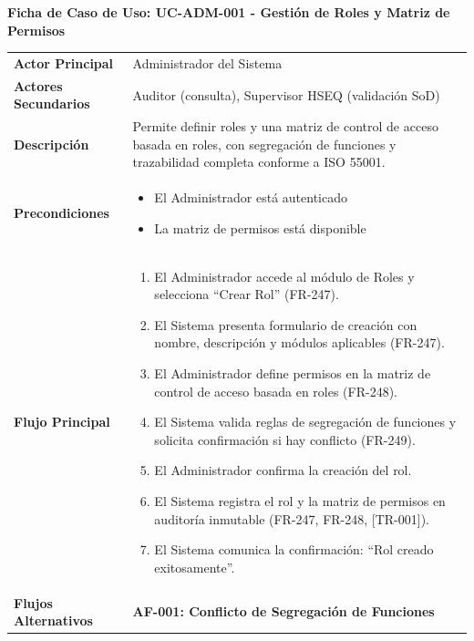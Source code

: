 \noindent\textbf{Ficha de Caso de Uso: UC-ADM-001 - Gestión de Roles y Matriz de Permisos}
\footnotesize\setlength{\tabcolsep}{4pt}\renewcommand{\arraystretch}{1.2}
\begin{longtable}{>{\raggedright\arraybackslash}p{0.21\textwidth} >{\raggedright\arraybackslash}p{0.74\textwidth}} \toprule
\textbf{Actor Principal} & Administrador del Sistema \\
\textbf{Actores Secundarios} & Auditor (consulta), Supervisor HSEQ (validación SoD) \\
\textbf{Descripción} & Permite definir roles y una matriz de control de acceso basada en roles, con segregación de funciones y trazabilidad completa conforme a ISO 55001. \\
\textbf{Precondiciones} & \parbox[t]{\linewidth}{\vspace{2pt} \begin{itemize}[leftmargin=1.5em, nosep, topsep=0pt]
\item El Administrador está autenticado
\item La matriz de permisos está disponible
\end{itemize} \vspace{2pt}} \\
\textbf{Flujo Principal} & \parbox[t]{\linewidth}{\vspace{2pt} \begin{enumerate}[leftmargin=1.5em, nosep, topsep=0pt]
\item El Administrador accede al módulo de Roles y selecciona ``Crear Rol'' (FR-247).
\item El Sistema presenta formulario de creación con nombre, descripción y módulos aplicables (FR-247).
\item El Administrador define permisos en la matriz de control de acceso basada en roles (FR-248).
\item El Sistema valida reglas de segregación de funciones y solicita confirmación si hay conflicto (FR-249).
\item El Administrador confirma la creación del rol.
\item El Sistema registra el rol y la matriz de permisos en auditoría inmutable (FR-247, FR-248, [TR-001]).
\item El Sistema comunica la confirmación: ``Rol creado exitosamente''.
\end{enumerate} \vspace{2pt}} \\
\textbf{Flujos Alternativos} & \parbox[t]{\linewidth}{\vspace{2pt} \vspace{4pt}\noindent\textbf{AF-001: Conflicto de Segregación de Funciones}
}
\end{longtable}
